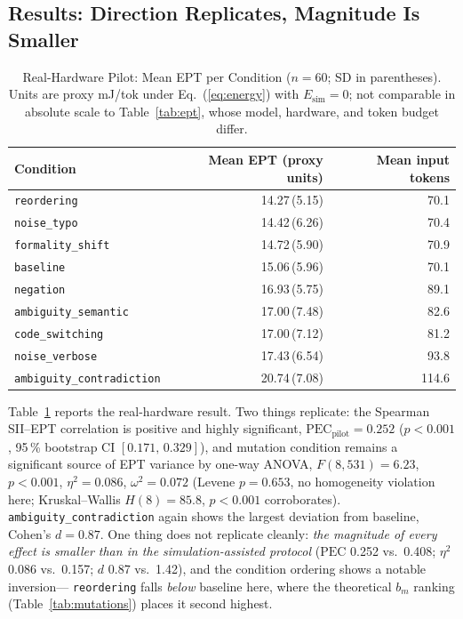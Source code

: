 \documentclass[conference]{IEEEtran}
\begin{document}
\subsection{Results: Direction Replicates, Magnitude Is Smaller}
\label{sec:pilot-results}
\begin{table}[t]
\caption{Real-Hardware Pilot: Mean EPT per Condition ($n=60$; SD in
parentheses). Units are proxy mJ/tok under Eq.~(\ref{eq:energy}) with
$E_\text{sim}=0$; not comparable in absolute scale to
Table~\ref{tab:ept}, whose model, hardware, and token budget differ.}
\label{tab:pilot-ept}
\centering
\setlength{\tabcolsep}{3.2pt}
\begin{tabular}{@{}lrr@{}}
\toprule
\textbf{Condition} & \textbf{Mean EPT (proxy units)} & \textbf{Mean input tokens} \\
\midrule
\texttt{reordering}                & 14.27\,(5.15) & 70.1  \\
\texttt{noise\_typo}               & 14.42\,(6.26) & 70.4  \\
\texttt{formality\_shift}          & 14.72\,(5.90) & 70.9  \\
\texttt{baseline}                  & 15.06\,(5.96) & 70.1  \\
\texttt{negation}                  & 16.93\,(5.75) & 89.1  \\
\texttt{ambiguity\_semantic}       & 17.00\,(7.48) & 82.6  \\
\texttt{code\_switching}           & 17.00\,(7.12) & 81.2  \\
\texttt{noise\_verbose}            & 17.43\,(6.54) & 93.8  \\
\texttt{ambiguity\_contradiction}  & 20.74\,(7.08) & 114.6 \\
\bottomrule
\end{tabular}
\end{table}
Table~\ref{tab:pilot-ept} reports the real-hardware result. Two things
replicate: the Spearman SII--EPT correlation is positive and highly
significant, $\mathrm{PEC}_\text{pilot}=0.252$ ($p<0.001$, 95\,\%
bootstrap CI $[0.171,\,0.329]$), and mutation condition remains a
significant source of EPT variance by one-way ANOVA,
$F(8,531)=6.23$, $p<0.001$, $\eta^2=0.086$, $\omega^2=0.072$
(Levene $p=0.653$, no homogeneity violation here; Kruskal--Wallis
$H(8)=85.8$, $p<0.001$ corroborates). \texttt{ambiguity\_contradiction}
again shows the largest deviation from baseline, Cohen's $d=0.87$.
One thing does not replicate cleanly: \emph{the magnitude of every
effect is smaller than in the simulation-assisted protocol}
($\mathrm{PEC}$ 0.252 vs.\ 0.408; $\eta^2$ 0.086 vs.\ 0.157; $d$ 0.87
vs.\ 1.42), and the condition ordering shows a notable inversion---
\texttt{reordering} falls \emph{below} baseline here, where the
theoretical $b_m$ ranking (Table~\ref{tab:mutations}) places it second
highest.
\end{document}
